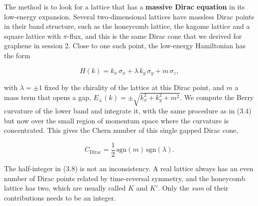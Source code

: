 The method is to look for a lattice that has a \textbf{massive Dirac equation} in its low-energy
expansion. Several two-dimensional lattices have massless Dirac points in their band structure, such
as the honeycomb lattice, the kagome lattice and a square lattice with $\pi$-flux, and this is the
same Dirac cone that we derived for graphene in session 2. Close to one such point, the low-energy
Hamiltonian has the form

\begin{equation}
H(k) = k_x\,\sigma_x + \lambda\, k_y\,\sigma_y + m\,\sigma_z,
\end{equation}

with $\lambda = \pm 1$ fixed by the chirality of the lattice at this Dirac point, and $m$ a mass term
that opens a gap, $E_\pm(k) = \pm\sqrt{k_x^2+k_y^2+m^2}$. We compute the Berry curvature of the lower
band and integrate it, with the same procedure as in (3.4) but now over the small region of momentum
space where the curvature is concentrated. This gives the Chern number of this single gapped Dirac
cone,

\begin{equation}
C_{\text{Dirac}} = \frac{1}{2}\,\mathrm{sgn}(m)\,\mathrm{sgn}(\lambda).
\end{equation}

The half-integer in (3.8) is not an inconsistency. A real lattice always has an even number of Dirac
points related by time-reversal symmetry, and the honeycomb lattice has two, which are usually called
$K$ and $K'$. Only the \emph{sum} of their contributions needs to be an integer.

